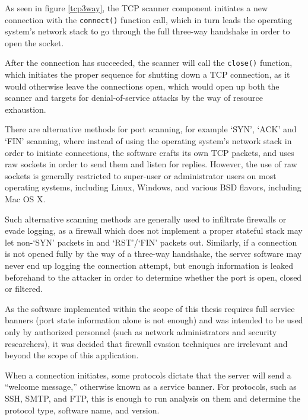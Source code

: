 \documentclass[a4paper,12pt]{article}
\begin{document}
	As seen in figure \ref{tcp3way}, the TCP scanner component initiates a new connection with the \texttt{connect()} function call, which in turn leads the operating system's network stack to go through the full three-way handshake in order to open the socket.
	
	After the connection has succeeded, the scanner will call the \texttt{close()} function, which initiates the proper sequence for shutting down a TCP connection, as it would otherwise leave the connections open, which would open up both the scanner and targets for denial-of-service attacks by the way of resource exhaustion\cite{erickson08}.
	
	There are alternative methods for port scanning, for example `SYN', `ACK' and `FIN' scanning\cite{kris07}, where instead of using the operating system's network stack in order to initiate connections, the software crafts its own TCP packets, and uses raw sockets in order to send them and listen for replies. However, the use of raw sockets is generally restricted to super-user or administrator users on most operating systems, including Linux, Windows, and various BSD flavors, including Mac OS X.
	
	Such alternative scanning methods are generally used to infiltrate firewalls or evade logging, as a firewall which does not implement a proper stateful stack may let non-`SYN' packets in and `RST'/`FIN' packets out. Similarly, if a connection is not opened fully by the way of a three-way handshake, the server software may never end up logging the connection attempt, but enough information is leaked beforehand to the attacker in order to determine whether the port is open, closed or filtered.
	
	As the software implemented within the scope of this thesis requires full service banners (port state information alone is not enough) and was intended to be used only by authorized personnel (such as network administrators and security researchers), it was decided that firewall evasion techniques are irrelevant and beyond the scope of this application.

 

	When a connection initiates, some protocols dictate that the server will send a ``welcome message,'' otherwise known as a service banner. For protocols, such as SSH, SMTP, and FTP, this is enough to run analysis on them and determine the protocol type, software name, and version.
	
\end{document}
